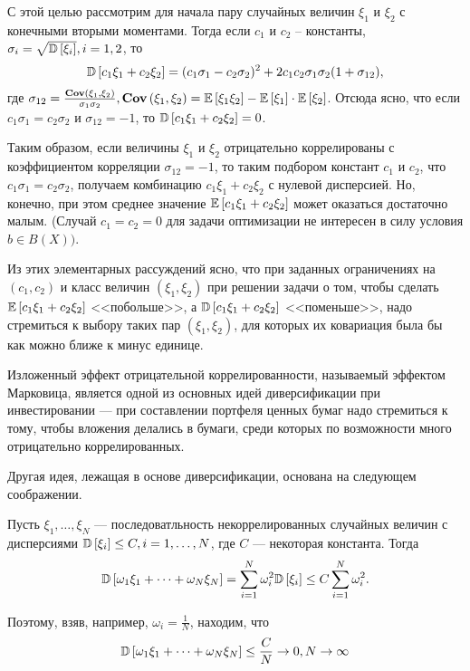С этой целью рассмотрим для начала пару случайных величин $\xi_1$ и $\xi_2$ с конечными вторыми моментами. Тогда если $c_1$ и $c_2$ -- константы,
$\sigma_i = \sqrt{\mathbb{D}\left[\xi_i\right]}, i=1,2$, то 
\begin{align}
\mathbb{D}\left[c_1 \xi_1 + c_2 \xi_2\right] = 
	(c_1 \sigma_1 - c_2 \sigma_2)^2 + 2 c_1 c_2 \sigma_1 \sigma_2 (1 + \sigma_{12}),
\end{align}
где $\sigma_{12} = \frac{\textbf{Cov}\left(\xi_1, \xi_2\right)}{\sigma_1 \sigma_2}, \textbf{Cov}\left(\xi_1, \xi_2\right) = \mathbb{E}\left[\xi_1 \xi_2\right] - \mathbb{E}\left[\xi_1\right] \cdot \mathbb{E}\left[\xi_2\right]$.
Отсюда ясно, что если $c_1 \sigma_1 = c_2 \sigma_2$ и $\sigma_{12} = -1$, то $\mathbb{D}\left[c_1 \xi_1 + c_2 \xi_2\right] = 0$.

Таким образом, если величины $\xi_1$ и $\xi_2$ отрицательно коррелированы с коэффициентом корреляции $\sigma_{12} = -1$, то таким подбором
констант $c_1$ и $c_2$, что $c_1 \sigma_1 = c_2 \sigma_2$, получаем комбинацию $c_1 \xi_1 + c_2 \xi_2$ с нулевой дисперсией. Но,
конечно, при этом среднее значение $\mathbb{E}\left[c_1 \xi_1 + c_2 \xi_2\right]$ может оказаться достаточно малым. (Случай $c_1 = c_2 = 0$ для задачи 
оптимизации не интересен в силу условия $b \in B(X))$.

Из этих элементарных рассуждений ясно, что при заданных ограничениях на $(c_1, c_2)$ и класс величин $(\xi_1, \xi_2)$ при решении задачи о том,
чтобы сделать $\mathbb{E}\left[c_1 \xi_1 + c_2 \xi_2\right]$ <<побольше>>, а $\mathbb{D}\left[c_1 \xi_1 + c_2 \xi_2\right]$ <<поменьше>>, надо стремиться к выбору таких пар 
$(\xi_1, \xi_2)$, для которых их ковариация была бы как можно ближе к минус единице.

Изложенный эффект отрицательной коррелированности, называемый эффектом Марковица, является одной из основных идей диверсификации при инвестировании ---
при составлении портфеля ценных бумаг надо стремиться к тому, чтобы вложения делались в бумаги, среди которых по возможности много отрицательно коррелированных.

Другая идея, лежащая в основе диверсификации, основана на следующем соображении.

Пусть $\xi_1, \dots, \xi_N$ --- последоватльность некоррелированных случайных величин с дисперсиями $\mathbb{D}\left[\xi_i\right] \le C, i=1, \dots, N$, 
где $C$ --- некоторая константа. Тогда
\begin{align}
\mathbb{D}\left[\omega_1 \xi_1 + \dots + \omega_N \xi_N\right] = \sum_{i=1}^{N} \omega_i^2 \mathbb{D}\left[\xi_i\right] \le C \sum_{i=1}^{N} \omega_i^2 .
\end{align}

Поэтому, взяв, например, $\omega_i = \frac{1}{N}$, находим, что
\begin{align}
\mathbb{D}\left[\omega_1 \xi_1 + \dots + \omega_N \xi_N\right] \le \frac{C}{N} \rightarrow 0, N \rightarrow \infty
\end{align}


